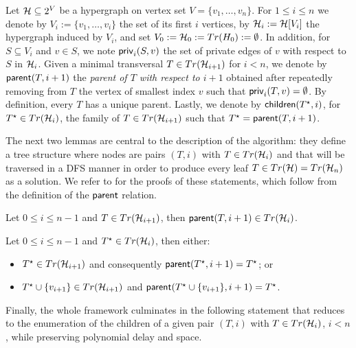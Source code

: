 Let \(\mathcal{H} \subseteq 2^{V}\) be a hypergraph on vertex set \(V=\{v_{1}, \dots, v_{n}\}\). 
For \(1\leq i\leq n\) we denote by \(V_{i} := \{v_{1}, \dots, v_{i}\}\) the set of its first \(i\) vertices, by \(\mathcal{H}_{i} := \mathcal{H}[V_{i}]\) the hypergraph induced by \(V_{i}\), and set \(V_0:=\mathcal{H}_{0} := Tr(H_{0}) := \emptyset\). 
In addition, for \(S \subseteq V_i\) and \(v \in S\), we note \(\operatorname{{\sf priv}}_{i}(S, v)\) the set of private edges of \(v\) with respect to $S$ in \(\mathcal{H}_{i}\).
Given a minimal transversal \(T \in Tr(\mathcal{H}_{i+1})\) for $i<n$, we denote by \(\operatorname{{\sf parent}}(T, i + 1)\) the \emph{parent of \(T\) with respect to \(i + 1\)} obtained after repeatedly removing from $T$ the vertex of smallest index \(v\) such that \(\operatorname{{\sf priv}}_{i}(T, v) = \emptyset\). 
By definition, every \(T\) has a unique parent. 
Lastly, we denote by \(\operatorname{{\sf children}}(T^{\star}, i)\), for \(T^{\star} \in Tr(\mathcal{H}_{i})\), the family of \(T \in Tr(\mathcal{H}_{i+1})\) such that \(T^{\star} = \operatorname{{\sf parent}}(T, i + 1)\). 

The next two lemmas are central to the description of the algorithm: they define a tree structure where nodes are pairs $(T,i)$ with $T\in Tr(\mathcal{H}_i)$ and that will be traversed in a DFS manner in order to produce every leaf $T\in Tr(\mathcal{H})=Tr(\mathcal{H}_n)$ as a solution.
We refer to \cite{bartier2024hypergraph} for the proofs of these statements, which follow from the definition of the $\operatorname{{\sf parent}}$ relation. %

\begin{lemma}
    Let \(0 \leq i \leq n - 1\) and \(T \in Tr(\mathcal{H}_{i+1})\), then \(\operatorname{{\sf parent}}(T, i + 1) \in Tr(\mathcal{H}_{i})\).
\end{lemma}

\begin{lemma}\label{lem:at-least-one-child}
    Let \(0 \leq i \leq n - 1\) and \(T^{\star} \in Tr(\mathcal{H}_{i})\), then either:
    \begin{itemize}
        \item \(T^{\star} \in Tr(\mathcal{H}_{i+1})\) and consequently \(\operatorname{{\sf parent}}(T^{\star}, i + 1) = T^{\star}\); or
        \item \(T^{\star} \cup \{v_{i+1}\} \in Tr(\mathcal{H}_{i+1})\) and \(\operatorname{{\sf parent}}(T^{\star} \cup \{v_{i+1}\}, i + 1) = T^{\star}\).
    \end{itemize} 
\end{lemma}

Finally, the whole framework culminates in the following statement that reduces \transenum{} to the enumeration of the children of a given pair $(T,i)$ with $T\in Tr(\mathcal{H}_i)$, $i<n$, while preserving polynomial delay and space.

